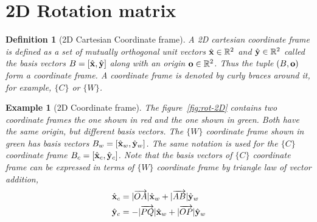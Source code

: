 \documentclass{article}
\newtheorem{defn}{Definition}
\newtheorem{example}{Example}
\begin{document}
\section{2D  Rotation matrix}
\begin{defn}[2D  Cartesian Coordinate frame]
 A 2D cartesian coordinate  frame  is defined as a set of mutually orthogonal unit
 vectors  $\hat{\mathbf{x}} \in  \mathbb{R}^2$  and
 $\hat{\mathbf{y}}\in  \mathbb{R}^2 $ called the basis vectors $B = [\hat{\mathbf{x}}, \hat{\mathbf{y}}]$
 along  with  an origin  $\mathbf{o}\in  \mathbb{R}^2$. Thus the tuple  $(B, \mathbf{o})$ form a
 coordinate frame. A  coordinate  frame is denoted  by curly braces around it,
 for  example, $\{C\}$ or $\{W\}$.
\end{defn}

\begin{example}[2D Coordinate frame]
  The figure~\ref{fig:rot-2D} contains two coordinate frames the one  shown  in
  red and   the one   shown in green. Both have  the  same origin, but
  different  basis vectors. The $\{W\}$ coordinate frame shown in green has
  basis vectors $B_w = [\hat{\mathbf{x}}_w, \hat{\mathbf{y}}_w]$. The same notation is used
  for the $\{C\}$ coordinate frame $B_c  =  [ \hat{\mathbf{x}}_c, \hat{\mathbf{y}}_c]$.
  Note that the basis vectors of $\{C\}$  coordinate frame  can be
  expressed  in  terms of $\{W\}$  coordinate frame by triangle  law of vector addition,
  \begin{equation}
  \begin{aligned}
    \hat{\mathbf{x}}_c &= |\overrightarrow{OA}|\hat{\mathbf{x}}_w + |\overrightarrow{AB}|\hat{\mathbf{y}}_w
    \\
    \hat{\mathbf{y}}_c &= -|\overrightarrow{PQ}|\hat{\mathbf{x}}_w + |\overrightarrow{OP}|\hat{\mathbf{y}}_w
  \end{aligned}
  \label{eq:c-as-w}
  \end{equation}


\end{example}
\end{document}
